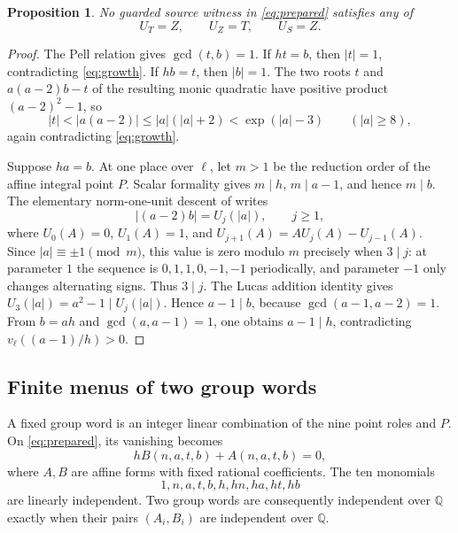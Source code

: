 \documentclass[11pt,a4paper]{article}
\newtheorem{proposition}[theorem]{Proposition}
\newcommand{\Q}{\mathbb Q}\newcommand{\Z}{\mathbb Z}
\begin{document}
\begin{proposition}\label{prop:cross}
No guarded source witness in \eqref{eq:prepared} satisfies any of
\[
                          U_T=Z,\qquad U_Z=T,\qquad U_S=Z.
\]
\end{proposition}
\begin{proof}
The Pell relation gives $\gcd(t,b)=1$. If $ht=b$, then
$|t|=1$, contradicting \eqref{eq:growth}.
If $hb=t$, then $|b|=1$. The two roots $t$ and
$a(a-2)b-t$ of the resulting monic quadratic have positive
product $(a-2)^2-1$, so
\[
 |t|<|a(a-2)|\le |a|(|a|+2)<\exp(|a|-3)
 \qquad(|a|\ge8),
\]
again contradicting \eqref{eq:growth}.

Suppose $ha=b$. At one place over $\ell$, let $m>1$ be the
reduction order of the affine integral point $P$. Scalar
formality gives $m\mid h$, $m\mid a-1$, and hence $m\mid b$.
The elementary norm-one-unit descent of \cite{Lucas} writes
\[
                   |(a-2)b|=U_j(|a|),\qquad j\ge1,
\]
where $U_0(A)=0$, $U_1(A)=1$, and
$U_{j+1}(A)=AU_j(A)-U_{j-1}(A)$.
Since $|a|\equiv\pm1\pmod m$, this value is zero modulo $m$
precisely when $3\mid j$: at parameter $1$ the sequence is
$0,1,1,0,-1,-1$ periodically, and parameter $-1$ only changes
alternating signs. Thus $3\mid j$. The Lucas addition identity
gives $U_3(|a|)=a^2-1\mid U_j(|a|)$. Hence $a-1\mid b$,
because $\gcd(a-1,a-2)=1$. From $b=ah$ and
$\gcd(a,a-1)=1$, one obtains $a-1\mid h$, contradicting
$v_\ell((a-1)/h)>0$.
\end{proof}

\subsection{Finite menus of two group words}

A fixed group word is an integer linear combination of the nine
point roles and $P$. On \eqref{eq:prepared}, its vanishing becomes
\[
                         hB(n,a,t,b)+A(n,a,t,b)=0,
\]
where $A,B$ are affine forms with fixed rational coefficients.
The ten monomials
\[
                       1,n,a,t,b,h,hn,ha,ht,hb
\]
are linearly independent.
Two group words are consequently independent over $\Q$ exactly
when their pairs $(A_i,B_i)$ are independent over $\Q$.
\end{document}
